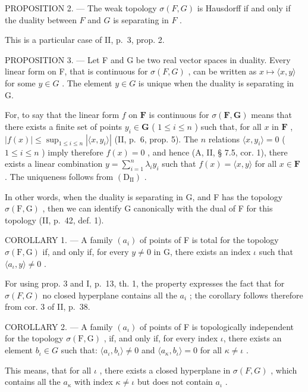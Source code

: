 PROPOSITION 2. --- The weak topology \(\sigma(F, G)\) is Hausdorff if and only if the duality between \(F\) and \(G\) is separating in \(F\) .

This is a particular case of II, p.~3, prop. 2.

PROPOSITION 3. --- Let F and G be two real vector spaces in duality. Every linear form on F, that is continuous for \(\sigma(F, G)\) , can be written as \(x \mapsto \langle x, y \rangle\) for some \(y \in G\) . The element \(y \in G\) is unique when the duality is separating in G.

For, to say that the linear form \(f\) on \(\mathbf{F}\) is continuous for \(\sigma(\mathbf{F}, \mathbf{G})\) means that there exists a finite set of points \(y_i \in \mathbf{G}\) ( \(1 \leqslant i \leqslant n\) ) such that, for all \(x\) in \(\mathbf{F}\) , \(|f(x)| \leqslant \sup_{1 \leqslant i \leqslant n} |\langle x, y_i \rangle|\) (II, p.~6, prop. 5). The \(n\) relations \(\langle x, y_i \rangle = 0\) ( \(1 \leqslant i \leqslant n\) ) imply therefore \(f(x) = 0\) , and hence (A, II, § 7.5, cor. 1), there exists a linear combination \(y = \sum_{i=1}^{n} \lambda_i y_i\) such that \(f(x) = \langle x, y \rangle\) for all \(x \in \mathbf{F}\) . The uniqueness follows from \((\mathrm{D}_{\mathrm{II}})\) .

In other words, when the duality is separating in G, and F has the topology \(\sigma(\mathrm{F}, \mathrm{G})\) , then we can identify G canonically with the dual of F for this topology (II, p.~42, def. 1).

COROLLARY 1. --- A family \((a_i)\) of points of F is total for the topology \(\sigma(\mathrm{F},\mathrm{G})\) if, and only if, for every \(y \neq 0\) in G, there exists an index \(\iota\) such that \(\langle a_{\iota}, y \rangle \neq 0\) .

For using prop. 3 and I, p.~13, th. 1, the property expresses the fact that for \(\sigma(F, G)\) no closed hyperplane contains all the \(a_{i}\) ; the corollary follows therefore from cor. 3 of II, p.~38.

COROLLARY 2. --- A family \((a_{\iota})\) of points of F is topologically independent for the topology \(\sigma(\mathrm{F}, \mathrm{G})\) , if, and only if, for every index \(\iota\), there exists an element \(b_{\iota} \in G\) such that: \(\langle a_{\iota}, b_{\iota} \rangle \neq 0\) and \(\langle a_{\kappa}, b_{\iota} \rangle = 0\) for all \(\kappa \neq \iota\) .

This means, that for all \(\iota\) , there exists a closed hyperplane in \(\sigma(F, G)\) , which contains all the \(a_{\kappa}\) with index \(\kappa \neq \iota\) but does not contain \(a_{\iota}\) .

